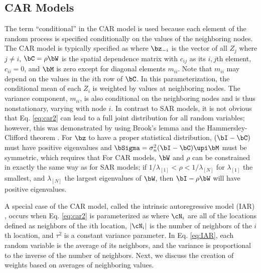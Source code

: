 

\subsection*{CAR Models}

The term ``conditional'' in the CAR model is used because each element of the random process is specified conditionally on the values of the neighboring nodes. The CAR model is typically specified as
where $\bz_{-i}$ is the vector of all $Z_j$ where $j \ne i$, $\bC =\rho\bW$ is the spatial dependence matrix with $c_{ij}$ as its $i,j$th element, $c_{ii} = 0$, and $\bM$ is zero except for diagonal elements $m_{ii}$. Note that $m_{ii}$ may depend on the values in the $i$th row of $\bC$. In this parameterization, the conditional mean of each $Z_i$ is weighted by values at neighboring nodes. The variance component, $m_{ii}$, is also conditional on the neighboring nodes and is thus nonstationary, varying with node $i$.  In contrast to SAR models, it is not obvious that Eq. \ref{eq:car2} can lead to a full joint distribution for all random variables; however, this was demonstrated by \citet{Besa:spat:1974} using Brook's lemma \citep{Broo:dist:1964} and the Hammersley-Clifford theorem \citep{Hamm:Clif:Mark:1971,Clif:Mark:1990}. For $\bz$ to have a proper statistical distribution, $(\bI-\bC)$ must have positive eigenvalues and $\bSigma = \sigma^2_n(\bI-\bC)\upi\bM$ must be symmetric, which requires that
For CAR models, $\bW$ and $\rho$ can be constrained in exactly the same way as for SAR models; if $1/\lambda_{[1]} < \rho < 1/\lambda_{[N]}$ for $\lambda_{[1]}$ the smallest, and $\lambda_{[N]}$ the largest eigenvalues of $\bW$, then $\bI - \rho\bW$ will have positive eigenvalues. 

A special case of the CAR model, called the intrinsic autoregressive model (IAR) \citep{Besa:Koop:cond:1995}, occurs when Eq. \ref{eq:car2} is parameterized as
where $\cN_i$ are all of the locations defined as neighbors of the $i$th location, $|\cN_i|$ is the number of neighbors of the $i$th location, and $\tau^2$ is a constant variance parameter.  In Eq. \ref{eq:IAR}, each random variable is the average of its neighbors, and the variance is proportional to the inverse of the number of neighbors.  Next, we discuss the creation of weights based on averages of neighboring values.


